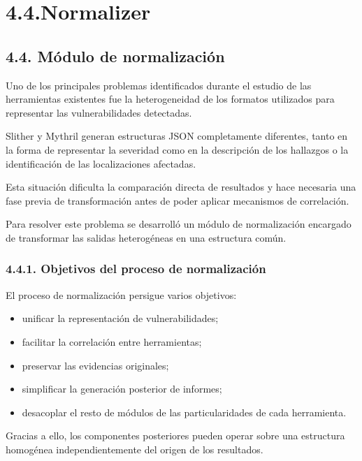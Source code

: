 \section{4.4.Normalizer}\label{normalizer}

\subsection{4.4. Módulo de
normalización}\label{muxf3dulo-de-normalizaciuxf3n}

Uno de los principales problemas identificados durante el estudio de las
herramientas existentes fue la heterogeneidad de los formatos utilizados
para representar las vulnerabilidades detectadas.

Slither y Mythril generan estructuras JSON completamente diferentes,
tanto en la forma de representar la severidad como en la descripción de
los hallazgos o la identificación de las localizaciones afectadas.

Esta situación dificulta la comparación directa de resultados y hace
necesaria una fase previa de transformación antes de poder aplicar
mecanismos de correlación.

Para resolver este problema se desarrolló un módulo de normalización
encargado de transformar las salidas heterogéneas en una estructura
común.

\subsubsection{4.4.1. Objetivos del proceso de
normalización}\label{objetivos-del-proceso-de-normalizaciuxf3n}

El proceso de normalización persigue varios objetivos:

\begin{itemize}
\tightlist
\item
  unificar la representación de vulnerabilidades;
\item
  facilitar la correlación entre herramientas;
\item
  preservar las evidencias originales;
\item
  simplificar la generación posterior de informes;
\item
  desacoplar el resto de módulos de las particularidades de cada
  herramienta.
\end{itemize}

Gracias a ello, los componentes posteriores pueden operar sobre una
estructura homogénea independientemente del origen de los resultados.

